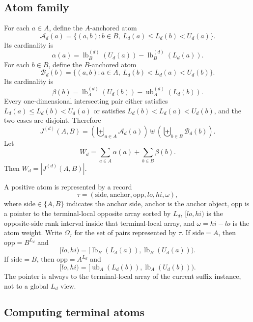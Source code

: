 \documentclass[11pt]{article}
\newcommand{\lb}{\operatorname{lb}}
\newcommand{\ub}{\operatorname{ub}}
\theoremstyle{definition}
\begin{document}
\subsection{Atom family}

For each $a\in A$, define the $A$-anchored atom
\[
  \mathcal A_d(a)=
  \{(a,b):b\in B,\ L_d(a)\le L_d(b)<U_d(a)\}.
\]
Its cardinality is
\[
  \alpha(a)=
  \lb_B^{(d)}(U_d(a))-\lb_B^{(d)}(L_d(a)).
\]
For each $b\in B$, define the $B$-anchored atom
\[
  \mathcal B_d(b)=
  \{(a,b):a\in A,\ L_d(b)<L_d(a)<U_d(b)\}.
\]
Its cardinality is
\[
  \beta(b)=
  \lb_A^{(d)}(U_d(b))-\ub_A^{(d)}(L_d(b)).
\]
Every one-dimensional intersecting pair either satisfies $L_d(a)\le L_d(b)<U_d(a)$ or satisfies $L_d(b)<L_d(a)<U_d(b)$, and the two cases are disjoint.  Therefore
\[
  J^{(d)}(A,B)=
  \left(\biguplus_{a\in A}\mathcal A_d(a)\right)
  \uplus
  \left(\biguplus_{b\in B}\mathcal B_d(b)\right).
\]
Let
\[
  W_d=\sum_{a\in A}\alpha(a)+\sum_{b\in B}\beta(b).
\]
Then $W_d=|J^{(d)}(A,B)|$.

A positive atom is represented by a record
\[
  \tau=(\mathrm{side},\mathrm{anchor},\mathrm{opp},lo,hi,\omega),
\]
where $\mathrm{side}\in\{A,B\}$ indicates the anchor side, $\mathrm{anchor}$ is the anchor object, $\mathrm{opp}$ is a pointer to the terminal-local opposite array sorted by $L_d$, $[lo,hi)$ is the opposite-side rank interval inside that terminal-local array, and $\omega=hi-lo$ is the atom weight.  Write $\Omega_\tau$ for the set of pairs represented by $\tau$.  If $\mathrm{side}=A$, then $\mathrm{opp}=B^{L_d}$ and
\[
  [lo,hi)=[\lb_B(L_d(a)),\lb_B(U_d(a))).
\]
If $\mathrm{side}=B$, then $\mathrm{opp}=A^{L_d}$ and
\[
  [lo,hi)=[\ub_A(L_d(b)),\lb_A(U_d(b))).
\]
The pointer is always to the terminal-local array of the current suffix instance, not to a global $L_d$ view.

\subsection{Computing terminal atoms}
\end{document}

